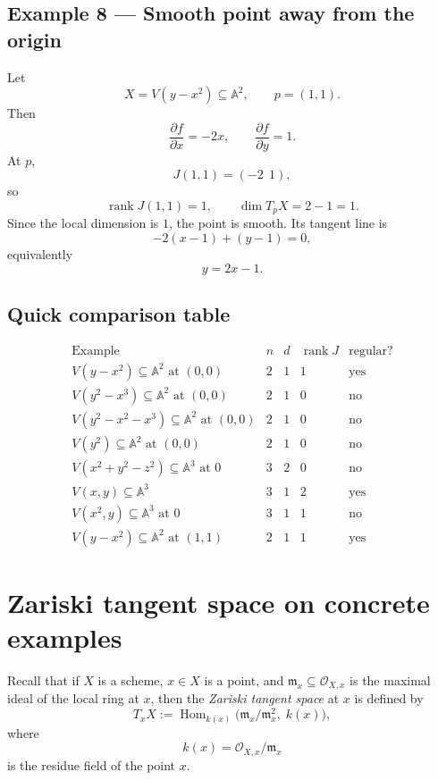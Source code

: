 \documentclass[12pt,a4paper]{article}
\theoremstyle{plain}
\theoremstyle{definition}      %
\begin{document}
	\subsection*{Example 8 --- Smooth point away from the origin}
	
	Let
	\[
	X=V(y-x^2)\subseteq \mathbb A^2,
	\qquad
	p=(1,1).
	\]
	Then
	\[
	\frac{\partial f}{\partial x}=-2x,
	\qquad
	\frac{\partial f}{\partial y}=1.
	\]
	At \(p\),
	\[
	J(1,1)=(-2\ \ 1),
	\]
	so
	\[
	\operatorname{rank}J(1,1)=1,
	\qquad
	\dim T_pX=2-1=1.
	\]
	Since the local dimension is \(1\), the point is smooth. Its tangent line is
	\[
	-2(x-1)+(y-1)=0,
	\]
	equivalently
	\[
	y=2x-1.
	\]
	
	\subsection*{Quick comparison table}
	
	\[
	\begin{array}{c|c|c|c|c}
		\text{Example} & n & d & \operatorname{rank}J & \text{regular?}\\
		\hline
		V(y-x^2)\subseteq \mathbb A^2 \text{ at }(0,0) & 2 & 1 & 1 & \text{yes}\\
		V(y^2-x^3)\subseteq \mathbb A^2 \text{ at }(0,0) & 2 & 1 & 0 & \text{no}\\
		V(y^2-x^2-x^3)\subseteq \mathbb A^2 \text{ at }(0,0) & 2 & 1 & 0 & \text{no}\\
		V(y^2)\subseteq \mathbb A^2 \text{ at }(0,0) & 2 & 1 & 0 & \text{no}\\
		V(x^2+y^2-z^2)\subseteq \mathbb A^3 \text{ at }0 & 3 & 2 & 0 & \text{no}\\
		V(x,y)\subseteq \mathbb A^3 & 3 & 1 & 2 & \text{yes}\\
		V(x^2,y)\subseteq \mathbb A^3 \text{ at }0 & 3 & 1 & 1 & \text{no}\\
		V(y-x^2)\subseteq \mathbb A^2 \text{ at }(1,1) & 2 & 1 & 1 & \text{yes}
	\end{array}
	\]
	
	\section*{Zariski tangent space on concrete examples}
	
	Recall that if \(X\) is a scheme, \(x\in X\) is a point, and \(\mathfrak m_x\subseteq \mathcal O_{X,x}\) is the maximal ideal of the local ring at \(x\), then the \emph{Zariski tangent space} at \(x\) is defined by
	\[
	T_xX:=\operatorname{Hom}_{k(x)}\!\bigl(\mathfrak m_x/\mathfrak m_x^2,\;k(x)\bigr),
	\]
	where
	\[
	k(x)=\mathcal O_{X,x}/\mathfrak m_x
	\]
	is the residue field of the point \(x\).
	
\end{document}
